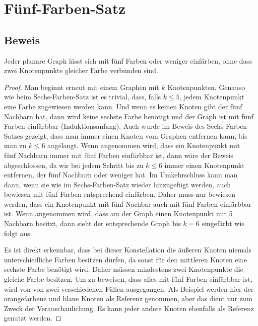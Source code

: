 \section{Fünf-Farben-Satz}
\subsection{Beweis}
\begin{theorem}
    Jeder planare Graph lässt sich mit fünf Farben oder weniger einfärben, ohne dass zwei Knotenpunkte gleicher Farbe verbunden sind.
\end{theorem}
\begin{proof}
    Man beginnt erneut mit einem Graphen mit $k$ Knotenpunkten. Genauso wie beim Sechs-Farben-Satz ist es trivial, dass, falls $k\leq5$, jedem Knotenpunkt eine Farbe zugewiesen werden kann. Und wenn es keinen Knoten gibt der fünf Nachbarn hat, dann wird keine sechste Farbe benötigt und der Graph ist mit fünf Farben einfärbbar (Induktionsanfang). Auch wurde im Beweis des Sechs-Farben-Satzes gezeigt, dass man immer einen Knoten vom Graphen entfernen kann, bis man zu $k\leq6$ angelangt. Wenn angenommen wird, dass ein Knotenpunkt mit fünf Nachbarn immer mit fünf Farben einfärbbar ist, dann wäre der Beweis abgeschlossen, da wir bei jedem Schritt bis zu $k\leq6$ immer einen Knotenpunkt entfernen, der fünf Nachbarn oder weniger hat. Im Umkehrschluss kann man dann, wenn sie wie im Sechs-Farben-Satz wieder hinzugefügt werden, auch bewiesen mit fünf Farben entsprechend einfärben. Daher muss nur bewiesen werden, dass ein Knotenpunkt mit fünf Nachbar auch mit fünf Farben einfärbbar ist. Wenn angenommen wird, dass am der Graph einen Knotenpunkt mit 5 Nachbarn besitzt, dann sieht der entsprechende Graph bis $k=6$ eingefärbt wie folgt aus.
    
    \begin{center}
    \end{center}
    
    Es ist direkt erkennbar, dass bei dieser Konstellation die äußeren Knoten niemals unterschiedliche Farben besitzen dürfen, da sonst für den mittleren Knoten eine sechste Farbe benötigt wird. Daher müssen mindestens zwei Knotenpunkte die gleiche Farbe besitzen. Um zu beweisen, dass alles mit fünf Farben einfärbbar ist, wird von von zwei verschiedenen Fällen ausgegangen. Als Beispiel werden hier der orangefarbene und blaue Knoten als Referenz genommen, aber das dient nur zum Zweck der Veranschaulichung. Es kann jeder andere Knoten ebenfalls als Referenz genutzt werden.
    

\end{proof}
